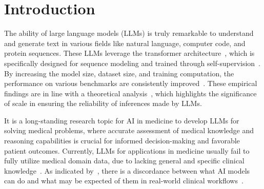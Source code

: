 \documentclass{article} %
\begin{document}
\section{Introduction}

The ability of large language models (LLMs) is truly remarkable to understand and generate text in various fields like natural language, computer code, and protein sequences. These LLMs leverage the transformer architecture~\citep{vaswani2017attention}, which is specifically designed for sequence modeling and trained through self-supervision~\citep{kenton2019bert}. By increasing the model size, dataset size, and training computation, the performance on various benchmarks are consistently improved~\citep{liang2022holistic}. These empirical findings are in line with a theoretical analysis~\citep{kaplan2020scaling}, which highlights the significance of scale in ensuring the reliability of inferences made by LLMs.


It is a long-standing research topic for AI in medicine to develop LLMs for solving medical problems, where accurate assessment of medical knowledge and reasoning capabilities is crucial for informed decision-making and favorable patient outcomes. Currently, LLMs for applications in medicine usually fail to fully utilize medical domain data, due to lacking general and specific clinical knowledge~\citep{yim2020predicting}. As indicated by~\citep{singhal2022large}, there is a discordance between what AI models can do and what may be expected of them in real-world clinical workflows~\citep{lakkaraju2022rethinking, schaekermann2020expert}. 
\end{document}
